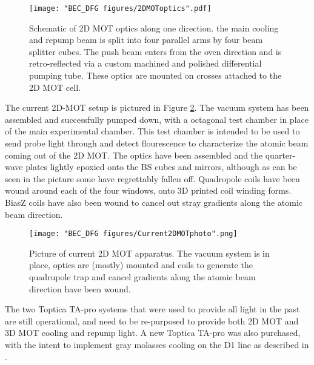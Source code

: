 \begin{figure}
	\texttt{[image: "BEC\_DFG figures/2DMOToptics".pdf]}
\caption[Schematic of 2D MOT optics]{Schematic of 2D MOT optics along one direction. the main cooling and repump beam is split into four parallel arms by four beam splitter cubes. The push beam enters from the oven direction and is retro-reflected via a custom machined and polished differential pumping tube. These optics are mounted on crosses attached to the 2D MOT cell.}
\label{fig:2DMOToptics}
\end{figure}

The current 2D-MOT setup is pictured in Figure \ref{fig:Current2DMOTphoto}. The vacuum system has been assembled and successfully pumped down, with a octagonal test chamber in place of the main experimental chamber. This test chamber is intended to be used to send probe light through and detect flourescence to characterize the atomic beam coming out of the 2D MOT. The optics have been assembled and the quarter-wave plates lightly epoxied onto the BS cubes and mirrors, although as can be seen in the picture some have regrettably fallen off. Quadropole coils have been wound around each of the four windows, onto 3D printed coil winding forms. BiasZ coils have also been wound to cancel out stray gradients along the atomic beam direction.
\begin{figure}
	\texttt{[image: "BEC\_DFG figures/Current2DMOTphoto".png]}
\caption[Picture of current 2D MOT apparatus]{Picture of current 2D MOT apparatus. The vacuum system is in place, optics are (mostly) mounted and coils to generate the quadrupole trap and cancel gradients along the atomic beam direction have been wound.  }
\label{fig:Current2DMOTphoto}
\end{figure}

The two Toptica TA-pro systems that were used to provide all \K{} light in the past are still operational, and need to be re-purposed to provide both 2D MOT and 3D MOT cooling and repump light. A new Toptica TA-pro was also purchased, with the intent to implement gray molasses cooling on the \K{} D1 line as described in \cite{Fernandes2012}. 